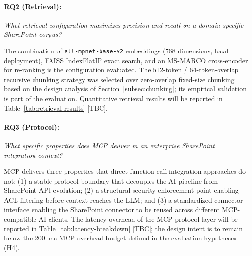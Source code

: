 
\paragraph{RQ2 (Retrieval):} \textit{What retrieval configuration maximizes precision and recall on a domain-specific SharePoint corpus?}

The combination of \texttt{all-mpnet-base-v2} embeddings (768 dimensions, local deployment), FAISS IndexFlatIP exact search, and an MS-MARCO cross-encoder for re-ranking is the configuration evaluated. The 512-token / 64-token-overlap recursive chunking strategy was selected over zero-overlap fixed-size chunking based on the design analysis of Section~\ref{subsec:chunking}; its empirical validation is part of the evaluation. Quantitative retrieval results will be reported in Table~\ref{tab:retrieval-results} [TBC].


\paragraph{RQ3 (Protocol):} \textit{What specific properties does MCP deliver in an enterprise SharePoint integration context?}

MCP delivers three properties that direct-function-call integration approaches do not: (1) a stable protocol boundary that decouples the AI pipeline from SharePoint API evolution; (2) a structural security enforcement point enabling ACL filtering before context reaches the LLM; and (3) a standardized connector interface enabling the SharePoint connector to be reused across different MCP-compatible AI clients. The latency overhead of the MCP protocol layer will be reported in Table~\ref{tab:latency-breakdown} [TBC]; the design intent is to remain below the 200~ms MCP overhead budget defined in the evaluation hypotheses (H4).


